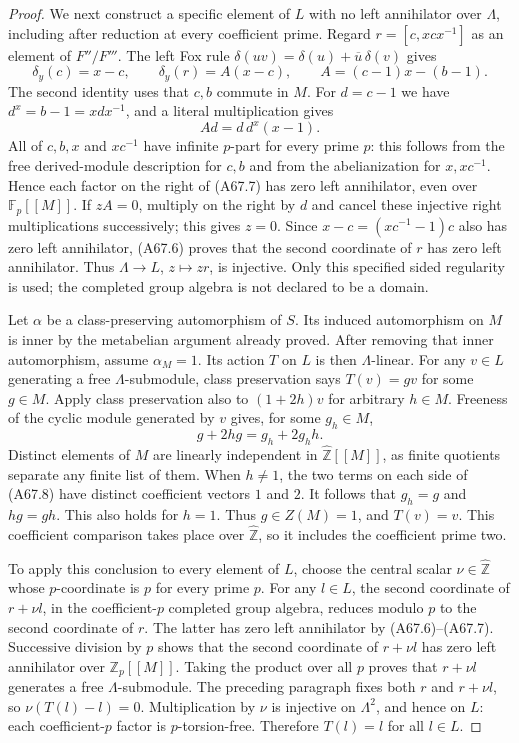 \documentclass[11pt,oneside]{article}
\begin{document}
\begin{proof}
We next construct a specific element of $L$
with no left annihilator over $\Lambda$,
including after reduction at every coefficient
prime. Regard
$r=[c,xcx^{-1}]$ as an element of
$F''/F'''$.
The left Fox rule
$\delta(uv)=\delta(u)+\overline u\,\delta(v)$
gives
\[
 \delta_y(c)=x-c,\qquad
 \delta_y(r)=A(x-c),\qquad
 A=(c-1)x-(b-1).
                                                        \tag{A67.6}
\]
The second identity uses that $c,b$ commute
in $M$. For $d=c-1$ we have
$d^x=b-1=xdx^{-1}$, and a literal multiplication
gives
\[
                   A d=d\,d^x(x-1).                   \tag{A67.7}
\]
All of $c,b,x$ and $xc^{-1}$ have infinite
$p$-part for every prime $p$:
this follows from the free derived-module
description for $c,b$ and from the
abelianization for $x,xc^{-1}$.
Hence each factor on the right of (A67.7)
has zero left annihilator, even over
$\mathbb F_p[[M]]$.
If $zA=0$, multiply on the right by $d$
and cancel these injective right
multiplications successively; this gives
$z=0$. Since $x-c=(xc^{-1}-1)c$ also has
zero left annihilator, (A67.6) proves that
the second coordinate of $r$ has zero
left annihilator. Thus
$\Lambda\to L$, $z\mapsto zr$, is injective.
Only this specified sided regularity is used;
the completed group algebra is not declared
to be a domain.

Let $\alpha$ be a class-preserving automorphism
of $S$. Its induced automorphism on $M$ is
inner by the metabelian argument already proved.
After removing that inner automorphism, assume
$\alpha_M=1$.
Its action $T$ on $L$ is then $\Lambda$-linear.
For any $v\in L$ generating a free
$\Lambda$-submodule, class preservation says
$T(v)=g v$ for some $g\in M$.
Apply class preservation also to
$(1+2h)v$ for arbitrary $h\in M$.
Freeness of the cyclic module generated by
$v$ gives, for some $g_h\in M$,
\[
                    g+2hg=g_h+2g_hh.                  \tag{A67.8}
\]
Distinct elements of $M$ are linearly
independent in $\widehat{\mathbb Z}[[M]]$,
as finite quotients separate any finite
list of them. When $h\ne1$, the two terms
on each side of (A67.8) have distinct
coefficient vectors $1$ and $2$.
It follows that $g_h=g$ and $hg=gh$.
This also holds for $h=1$.
Thus $g\in Z(M)=1$, and $T(v)=v$.
This coefficient comparison takes place
over $\widehat{\mathbb Z}$, so it includes
the coefficient prime two.

To apply this conclusion to every element
of $L$, choose the central scalar
$\nu\in\widehat{\mathbb Z}$ whose
$p$-coordinate is $p$ for every prime $p$.
For any $l\in L$, the second coordinate
of $r+\nu l$, in the coefficient-$p$
completed group algebra, reduces modulo
$p$ to the second coordinate of $r$.
The latter has zero left annihilator by
(A67.6)--(A67.7).
Successive division by $p$ shows that
the second coordinate of $r+\nu l$ has
zero left annihilator over
$\mathbb Z_p[[M]]$.
Taking the product over all $p$ proves
that $r+\nu l$ generates a free
$\Lambda$-submodule.
The preceding paragraph fixes both $r$
and $r+\nu l$, so $\nu(T(l)-l)=0$.
Multiplication by $\nu$ is injective
on $\Lambda^2$, and hence on $L$:
each coefficient-$p$ factor is
$p$-torsion-free.
Therefore $T(l)=l$ for all $l\in L$.


\end{proof}
\end{document}
